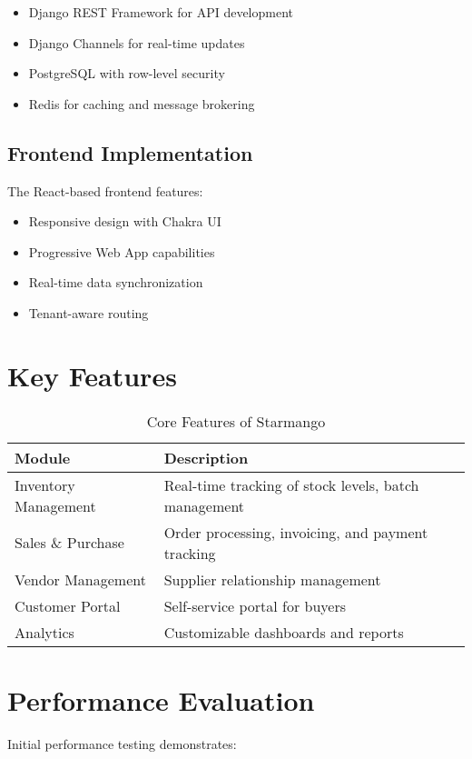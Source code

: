 \documentclass[conference]{IEEEtran}
\begin{document}
\begin{itemize}
    \item Django REST Framework for API development
    \item Django Channels for real-time updates
    \item PostgreSQL with row-level security
    \item Redis for caching and message brokering
\end{itemize}

\subsection{Frontend Implementation}
The React-based frontend features:

\begin{itemize}
    \item Responsive design with Chakra UI
    \item Progressive Web App capabilities
    \item Real-time data synchronization
    \item Tenant-aware routing
\end{itemize}

\section{Key Features}

\begin{table}[h]
\caption{Core Features of Starmango}
\label{tab:features}
\begin{tabular}{@{}ll@{}}
\toprule
\textbf{Module} & \textbf{Description} \\ \midrule
Inventory Management & Real-time tracking of stock levels, batch management \\
Sales \& Purchase & Order processing, invoicing, and payment tracking \\
Vendor Management & Supplier relationship management \\
Customer Portal & Self-service portal for buyers \\
Analytics & Customizable dashboards and reports \\ \bottomrule
\end{tabular}
\end{table}

\section{Performance Evaluation}
Initial performance testing demonstrates:
\end{document}
